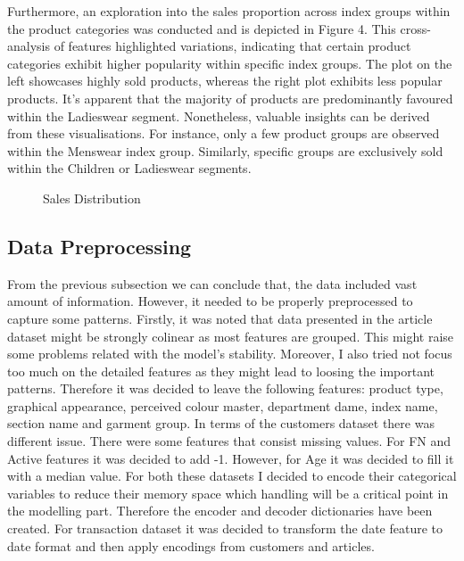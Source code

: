 \documentclass[conference,compsoc]{IEEEtran}
\begin{document}
Furthermore, an exploration into the sales proportion across index groups within the product categories was conducted and is depicted in Figure 4. This cross-analysis of features highlighted variations, indicating that certain product categories exhibit higher popularity within specific index groups. The plot on the left showcases highly sold products, whereas the right plot exhibits less popular products. It's apparent that the majority of products are predominantly favoured within the Ladieswear segment. Nonetheless, valuable insights can be derived from these visualisations. For instance, only a few product groups are observed within the Menswear index group. Similarly, specific groups are exclusively sold within the Children or Ladieswear segments.

\begin{figure}[htbp]
    \centering
    \caption{Sales Distribution}
    \label{fig:example}
\end{figure}

\subsection{Data Preprocessing}

From the previous subsection we can conclude that, the data included vast amount of information. However, it needed to be properly preprocessed to capture some patterns. Firstly, it was noted that data presented in the article dataset might be strongly colinear as most features are grouped. This might raise some problems related with the model's stability. Moreover, I also tried not focus too much on the detailed features as they might lead to loosing the important patterns. Therefore it was decided to leave the following features: product type, graphical appearance, perceived colour master, department dame, index name, section name and garment group. In terms of the customers dataset there was different issue. There were some features that consist missing values. For FN and Active features it was decided to add -1. However, for Age it was decided to fill it with a median value. For both these datasets I decided to encode their categorical variables to reduce their memory space which handling will be a critical point in the modelling part. Therefore the encoder and decoder dictionaries have been created.  For transaction dataset it was decided to transform the date feature to date format and then apply encodings from customers and articles. 
\end{document}
